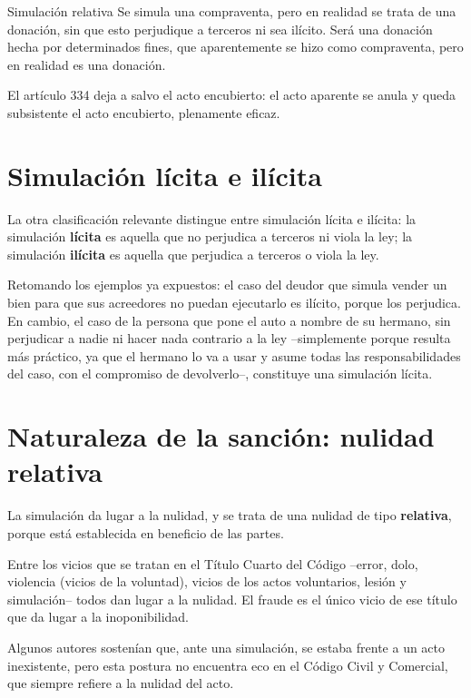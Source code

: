 \documentclass[12pt,oneside]{book}
\begin{document}
\begin{example}{Simulación relativa}
Se simula una compraventa, pero en realidad se trata de una donación, sin que esto perjudique a terceros ni sea ilícito. Será una donación hecha por determinados fines, que aparentemente se hizo como compraventa, pero en realidad es una donación.
\end{example}

El artículo 334 deja a salvo el acto encubierto: el acto aparente se anula y queda subsistente el acto encubierto, plenamente eficaz.

\section{Simulación lícita e ilícita}

La otra clasificación relevante distingue entre simulación lícita e ilícita: la simulación \textbf{lícita} es aquella que no perjudica a terceros ni viola la ley; la simulación \textbf{ilícita} es aquella que perjudica a terceros o viola la ley.

Retomando los ejemplos ya expuestos: el caso del deudor que simula vender un bien para que sus acreedores no puedan ejecutarlo es ilícito, porque los perjudica. En cambio, el caso de la persona que pone el auto a nombre de su hermano, sin perjudicar a nadie ni hacer nada contrario a la ley --simplemente porque resulta más práctico, ya que el hermano lo va a usar y asume todas las responsabilidades del caso, con el compromiso de devolverlo--, constituye una simulación lícita.

\section{Naturaleza de la sanción: nulidad relativa}

La simulación da lugar a la nulidad, y se trata de una nulidad de tipo \textbf{relativa}, porque está establecida en beneficio de las partes.

Entre los vicios que se tratan en el Título Cuarto del Código --error, dolo, violencia (vicios de la voluntad), vicios de los actos voluntarios, lesión y simulación-- todos dan lugar a la nulidad. El fraude es el único vicio de ese título que da lugar a la inoponibilidad.

Algunos autores sostenían que, ante una simulación, se estaba frente a un acto inexistente, pero esta postura no encuentra eco en el Código Civil y Comercial, que siempre refiere a la nulidad del acto.
\end{document}
